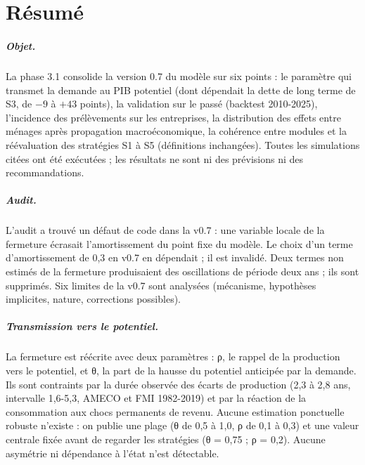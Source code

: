 \chapter*{Résumé}

\paragraph{Objet.} La phase 3.1 consolide la version 0.7 du modèle sur six points : le paramètre qui transmet la
demande au PIB potentiel (dont dépendait la dette de long terme de S3, de $-9$ à $+43$ points), la validation sur le
passé (backtest 2010-2025), l'incidence des prélèvements sur les entreprises, la distribution des effets entre ménages
après propagation macroéconomique, la cohérence entre modules et la réévaluation des stratégies S1 à S5 (définitions
inchangées). Toutes les simulations citées ont été exécutées ; les résultats ne sont ni des prévisions ni des
recommandations.

\paragraph{Audit.} L'audit a trouvé un défaut de code dans la v0.7 : une variable locale de la fermeture écrasait
l'amortissement du point fixe du modèle. Le choix d'un terme d'amortissement de 0,3 en v0.7 en dépendait ; il est
invalidé. Deux termes non estimés de la fermeture produisaient des oscillations de période deux ans ; ils sont
supprimés. Six limites de la v0.7 sont analysées (mécanisme, hypothèses implicites, nature, corrections possibles).

\paragraph{Transmission vers le potentiel.} La fermeture est réécrite avec deux paramètres : ρ, le rappel de la
production vers le potentiel, et θ, la part de la hausse du potentiel anticipée par la demande. Ils sont contraints par
la durée observée des écarts de production (2,3 à 2,8 ans, intervalle 1,6-5,3, AMECO et FMI 1982-2019) et par la
réaction de la consommation aux chocs permanents de revenu. Aucune estimation ponctuelle robuste n'existe : on publie
une plage (θ de 0,5 à 1,0, ρ de 0,1 à 0,3) et une valeur centrale fixée avant de regarder les stratégies (θ = 0,75 ;
ρ = 0,2). Aucune asymétrie ni dépendance à l'état n'est détectable.

